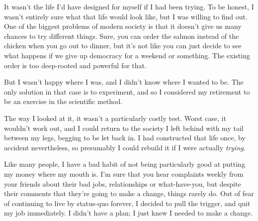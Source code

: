 \documentclass[]{book}
\begin{document}
It wasn't the life I'd have designed for myself if I had been trying. To be
honest, I wasn't entirely sure what that life would look like, but I was willing
to find out. One of the biggest problems of modern society is that it doesn't
give us many chances to try different things. Sure, you can order the salmon
instead of the chicken when you go out to dinner, but it's not like you can just
decide to see what happens if we give up democracy for a weekend or something.
The existing order is too deep-rooted and powerful for that.

But I wasn't happy where I was, and I didn't know where I wanted to be. The only
solution in that case is to experiment, and so I considered my retirement to be
an exercise in the scientific method.

The way I looked at it, it wasn't a particularly costly test. Worst case, it
wouldn't work out, and I could return to the society I left behind with my tail
between my legs, begging to be let back in. I had constructed that life once, by
accident nevertheless, so presumably I could rebuild it if I were actually
\textit{trying}.

Like many people, I have a bad habit of not being particularly good at putting
my money where my mouth is.  I'm sure that you hear
complaints weekly from your friends about their bad jobs, relationships or
what-have-you, but despite their comments that they're going to make a change,
things rarely do. Out of fear of continuing to live by status-quo forever, I
decided to pull the trigger, and quit my job immediately. I didn't have a plan;
I just knew I needed to make a change.
\end{document}

